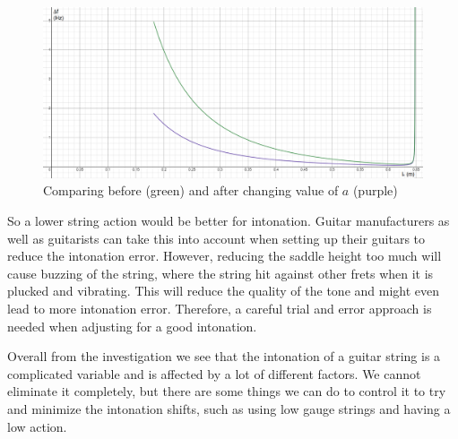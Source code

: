 \begin{figure}[!h]
    \includegraphics[width = \textwidth]{./ee/compare_graph_a.png}
    \caption{Comparing before (green) and after changing value of $a$ (purple)} \label{fig12}
\end{figure}
So a lower string action would be better for intonation. Guitar manufacturers as well as guitarists can take this into account when setting up their guitars to reduce the intonation error. However, reducing the saddle height too much will cause buzzing of the string, where the string hit against other frets when it is plucked and vibrating. This will reduce the quality of the tone and might even lead to more intonation error. Therefore, a careful trial and error approach is needed when adjusting for a good intonation. \par
Overall from the investigation we see that the intonation of a guitar string is a complicated variable and is affected by a lot of different factors. We cannot eliminate it completely, but there are some things we can do to control it to try and minimize the intonation shifts, such as using low gauge strings and having a low action.